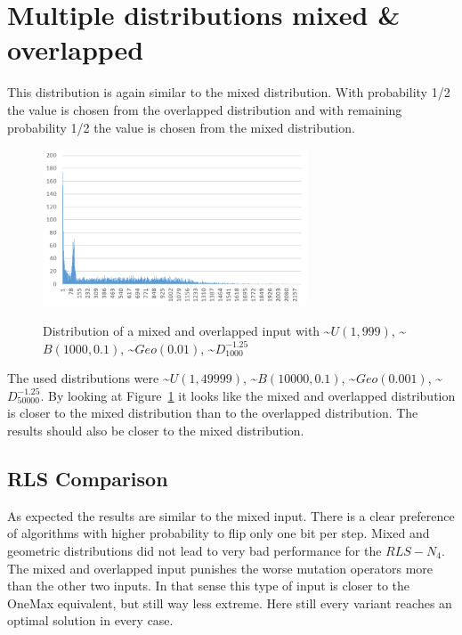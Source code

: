 \section{Multiple distributions mixed \& overlapped}
This distribution is again similar to the mixed distribution.
With probability 1/2 the value is chosen from the overlapped distribution and with remaining probability 1/2 the value is chosen from the mixed distribution.

\begin{figure}[h]
      \caption{Distribution of a mixed and overlapped input with \textasciitilde$U(1,999)$, \textasciitilde$B(1000,0.1)$, \textasciitilde$Geo(0.01)$, \textasciitilde$D^{-1.25}_{1000}$}
      \centering
      \includegraphics[width=0.7\textwidth]{figures/images/numberGenerator/mixedAndOverlapped.png}\label{fig:mixAndOverlDistExample}
\end{figure}

The used distributions were \textasciitilde$U(1,49999)$, \textasciitilde$B(10000,0.1)$, \textasciitilde$Geo(0.001)$, \textasciitilde$D^{-1.25}_{50000}$.
By looking at Figure~\ref{fig:mixAndOverlDistExample} it looks like the mixed and overlapped distribution is closer to the mixed distribution than to the overlapped distribution.
The results should also be closer to the mixed distribution.
\subsection{RLS Comparison}




As expected the results are similar to the mixed input.
There is a clear preference of algorithms with higher probability to flip only one bit per step.
Mixed and geometric distributions did not lead to very bad performance for the $RLS-N_4$.
The mixed and overlapped input punishes the worse mutation operators more than the other two inputs.
In that sense this type of input is closer to the OneMax equivalent, but still way less extreme.
Here still every variant reaches an optimal solution in every case.

